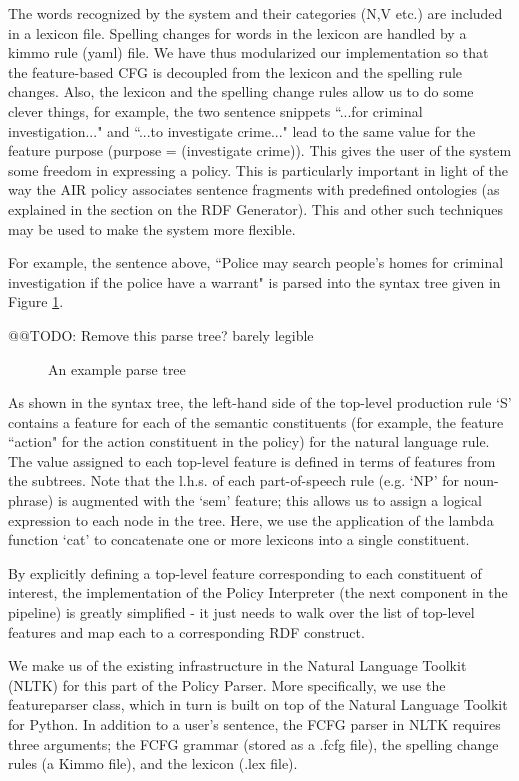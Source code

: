 \documentclass{llncs}
\begin{document}
The words recognized by the system and their categories (N,V etc.) are included in a lexicon file. Spelling changes for words in the lexicon are handled by a kimmo rule (yaml) file. We have thus modularized our implementation so that the feature-based CFG is decoupled from the lexicon and the spelling rule changes. Also, the lexicon and the spelling change rules allow us to do some clever things, for example, the two sentence snippets ``...for criminal investigation..." and ``...to investigate crime..." lead to the same value for the feature purpose (purpose = (investigate crime)). This gives the user of the system some freedom in expressing a policy. This is particularly important in light of the way the AIR policy associates sentence fragments with predefined ontologies (as explained in the section on the RDF Generator). This and other such techniques may be used to make the system more flexible.

For example, the sentence above, ``Police may search people's homes for criminal investigation if the police have a warrant" is parsed into the syntax tree given in Figure \ref{fig-syntax-tree}.

@@TODO: Remove this parse tree? barely legible

\begin{figure}[!h]
  \centerline{}
  \caption{An example parse tree}
  \label{fig-syntax-tree}
\end{figure}

As shown in the syntax tree, the left-hand side of the top-level production rule `S' contains a feature for each of the semantic constituents (for example, the feature ``action" for the action constituent in the policy) for the natural language rule. The value assigned to each top-level feature is defined in terms of features from the subtrees. Note that the l.h.s. of each part-of-speech rule (e.g. `NP' for noun-phrase) is augmented with the `sem' feature; this allows us to assign a logical expression to each node in the tree. Here, we use the application of the lambda function `cat' to concatenate one or more lexicons into a single constituent.

By explicitly defining a top-level feature corresponding to each constituent of interest, the implementation of the Policy Interpreter (the next component in the pipeline) is greatly simplified - it just needs to walk over the list of top-level features and map each to a corresponding RDF construct.

We make us of the existing infrastructure in the Natural Language Toolkit (NLTK) \cite{nltk} for this part of the Policy Parser. More specifically, we use the featureparser class, which in turn is built on top of the Natural Language Toolkit for Python. In addition to a user's sentence, the FCFG parser in NLTK requires three arguments; the FCFG grammar (stored as a .fcfg file), the spelling change rules (a Kimmo file), and the lexicon (.lex file). 
\end{document}
